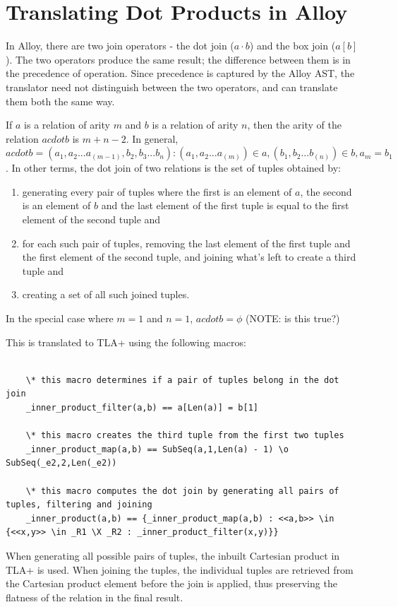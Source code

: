 \section{Translating Dot Products in Alloy}

In Alloy, there are two join operators - the dot join ($a \cdot b$) and the box join ($a[b]$). The two operators produce the same result; the difference between them is in the precedence of operation. Since precedence is captured by the Alloy AST, the translator need not distinguish between the two operators, and can translate them both the same way.

If $a$ is a relation of arity $m$ and $b$ is a relation of arity $n$, then the arity of the relation $a cdot b$ is $m+n-2$. In general, $a cdot b = {(a_1,a_2...a_(m-1),b_2,b_3...b_n) : (a_1,a_2...a_(m)) \in a, (b_1,b_2...b_(n)) \in b, a_m = b_1 }$. In other terms, the dot join of two relations is the set of tuples obtained by:

\begin{enumerate}
	\item generating every pair of tuples where the first is an element of $a$, the second is an element of $b$ and the last element of the first tuple is equal to the first element of the second tuple and
	\item for each such pair of tuples, removing the last element of the first tuple and the first element of the second tuple, and joining what's left to create a third tuple and
	\item creating a set of all such joined tuples.
\end{enumerate}


In the special case where $m = 1$ and $n = 1$, $a cdot b = \phi$  (NOTE: is this true?)


This is translated to TLA+ using the following macros:


\begin{lstlisting}

	\* this macro determines if a pair of tuples belong in the dot join
	_inner_product_filter(a,b) == a[Len(a)] = b[1]

	\* this macro creates the third tuple from the first two tuples
	_inner_product_map(a,b) == SubSeq(a,1,Len(a) - 1) \o SubSeq(_e2,2,Len(_e2))
	
	\* this macro computes the dot join by generating all pairs of tuples, filtering and joining
	_inner_product(a,b) == {_inner_product_map(a,b) : <<a,b>> \in {<<x,y>> \in _R1 \X _R2 : _inner_product_filter(x,y)}}
\end{lstlisting}

When generating all possible pairs of tuples, the inbuilt Cartesian product in TLA+ is used. When joining the tuples, the individual tuples are retrieved from the Cartesian product element before the join is applied, thus preserving the flatness of the relation in the final result.

